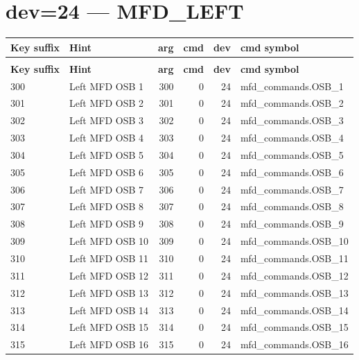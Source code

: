 \documentclass[10pt,a4paper]{article}
\begin{document}
\section{dev=24 — MFD\_LEFT}
\begin{longtable}{>{\ttfamily\small}p{38mm} >{\small}p{72mm} r r r >{\ttfamily\small}p{48mm}}
\toprule
\textbf{Key suffix} & \textbf{Hint} & \textbf{arg} & \textbf{cmd} & \textbf{dev} & \textbf{cmd symbol} \\
\midrule
\endfirsthead
\multicolumn{6}{l}{\small\itshape continued\ldots}\\
\toprule
\textbf{Key suffix} & \textbf{Hint} & \textbf{arg} & \textbf{cmd} & \textbf{dev} & \textbf{cmd symbol} \\
\midrule
\endhead
\bottomrule
\endfoot
\rowcolor{rowodd}
  300 & Left MFD OSB 1 & 300 & 0 & 24 & mfd\_commands.OSB\_1 \\
  301 & Left MFD OSB 2 & 301 & 0 & 24 & mfd\_commands.OSB\_2 \\
\rowcolor{rowodd}
  302 & Left MFD OSB 3 & 302 & 0 & 24 & mfd\_commands.OSB\_3 \\
  303 & Left MFD OSB 4 & 303 & 0 & 24 & mfd\_commands.OSB\_4 \\
\rowcolor{rowodd}
  304 & Left MFD OSB 5 & 304 & 0 & 24 & mfd\_commands.OSB\_5 \\
  305 & Left MFD OSB 6 & 305 & 0 & 24 & mfd\_commands.OSB\_6 \\
\rowcolor{rowodd}
  306 & Left MFD OSB 7 & 306 & 0 & 24 & mfd\_commands.OSB\_7 \\
  307 & Left MFD OSB 8 & 307 & 0 & 24 & mfd\_commands.OSB\_8 \\
\rowcolor{rowodd}
  308 & Left MFD OSB 9 & 308 & 0 & 24 & mfd\_commands.OSB\_9 \\
  309 & Left MFD OSB 10 & 309 & 0 & 24 & mfd\_commands.OSB\_10 \\
\rowcolor{rowodd}
  310 & Left MFD OSB 11 & 310 & 0 & 24 & mfd\_commands.OSB\_11 \\
  311 & Left MFD OSB 12 & 311 & 0 & 24 & mfd\_commands.OSB\_12 \\
\rowcolor{rowodd}
  312 & Left MFD OSB 13 & 312 & 0 & 24 & mfd\_commands.OSB\_13 \\
  313 & Left MFD OSB 14 & 313 & 0 & 24 & mfd\_commands.OSB\_14 \\
\rowcolor{rowodd}
  314 & Left MFD OSB 15 & 314 & 0 & 24 & mfd\_commands.OSB\_15 \\
  315 & Left MFD OSB 16 & 315 & 0 & 24 & mfd\_commands.OSB\_16 \\

\end{longtable}
\end{document}
